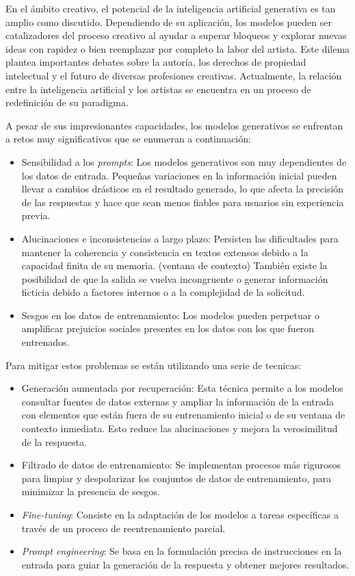En el ámbito creativo, el potencial de la inteligencia artificial generativa es tan amplio como discutido.
Dependiendo de su aplicación, los modelos pueden ser catalizadores del proceso creativo
al ayudar a superar bloqueos y explorar nuevas ideas con rapidez o bien
reemplazar por completo la labor del artista. 
Este dilema plantea importantes debates sobre la autoría, los derechos de propiedad intelectual 
y el futuro de diversas profesiones creativas.
Actualmente, la relación entre la inteligencia artificial 
y los artistas se encuentra en un proceso de redefinición de su paradigma.

A pesar de sus impresionantes capacidades, 
los modelos generativos se enfrentan a retos muy significativos que se enumeran a continuación:
\begin{itemize}
\item Sensibilidad a los \textit{prompts}:
Los modelos generativos son muy dependientes de los datos de entrada.
Pequeñas variaciones en la información inicial pueden llevar a cambios drásticos en el resultado generado,
lo que afecta la precisión de las respuestas y hace que sean menos fiables para usuarios sin experiencia previa.
\item Alucinaciones e inconsistencias a largo plazo:
Persisten las dificultades para mantener la coherencia y consistencia
en textos extensos debido a la capacidad finita de su memoria. (ventana de contexto)
También existe la posibilidad de que la salida se vuelva incongruente o generar información ficticia
debido a factores internos o a la complejidad de la solicitud.
\item Sesgos en los datos de entrenamiento: 
Los modelos pueden perpetuar o amplificar prejuicios sociales presentes en los datos con los que fueron entrenados.
\end{itemize}

Para mitigar estos problemas se están utilizando una serie de tecnicas:
\begin{itemize}
\item Generación aumentada por recuperación:
Esta técnica permite a los modelos consultar fuentes de datos externas 
y ampliar la información de la entrada con elementos que están fuera de su entrenamiento inicial
o de su ventana de contexto inmediata.
Esto reduce las alucinaciones y mejora la verosimilitud de la respuesta.
\item Filtrado de datos de entrenamiento: 
Se implementan procesos más rigurosos para limpiar y despolarizar los conjuntos de datos de entrenamiento,
para minimizar la presencia de sesgos.
\item \textit{Fine-tuning}: 
Consiste en la adaptación de los modelos a tareas específicas a través de un proceso de reentrenamiento parcial.
\item \textit{Prompt engineering}:
Se basa en la formulación precisa de instrucciones en la entrada para guiar la generación de la respuesta 
y obtener mejores resultados.
\end{itemize}

